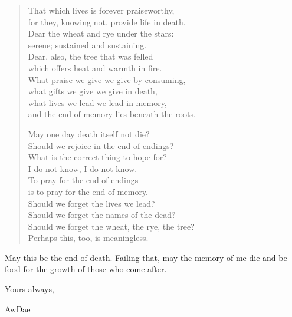\begin{verse}
That which lives is forever praiseworthy,\\
for they, knowing not, provide life in death.\\
Dear the wheat and rye under the stars:\\
serene; sustained and sustaining.\\
Dear, also, the tree that was felled\\
which offers heat and warmth in fire.\\
What praise we give we give by consuming,\\
what gifts we give we give in death,\\
what lives we lead we lead in memory,\\
and the end of memory lies beneath the roots.

May one day death itself not die?\\
Should we rejoice in the end of endings?\\
What is the correct thing to hope for?\\
I do not know, I do not know.\\
To pray for the end of endings\\
is to pray for the end of memory.\\
Should we forget the lives we lead?\\
Should we forget the names of the dead?\\
Should we forget the wheat, the rye, the tree?\\
Perhaps this, too, is meaningless.
\end{verse}

May this be the end of death. Failing that, may the memory of me die and be food for the growth of those who come after.

Yours always,

AwDae

